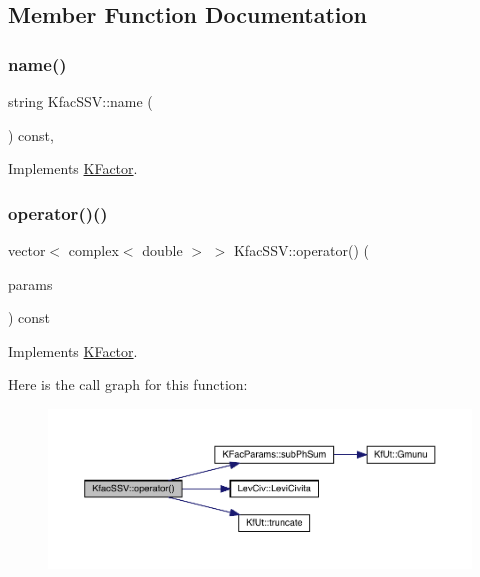 \subsection{Member Function Documentation}
\mbox{\label{classKfacSSV_a72d5e577525fa97365dbcfd4c5bea88d}} 
\subsubsection{\texorpdfstring{name()}{name()}}
{\footnotesize\ttfamily string Kfac\+S\+S\+V\+::name (\begin{DoxyParamCaption}{ }\end{DoxyParamCaption}) const\hspace{0.3cm}{\ttfamily [inline]}, {\ttfamily [virtual]}}



Implements \mbox{\hyperlink{classKFactor_ae578f8d6e4b525895427717da99cab6c}{K\+Factor}}.

\mbox{\label{classKfacSSV_aeea4f3f068452d233d4111d72c05cd4f}} 
\subsubsection{\texorpdfstring{operator()()}{operator()()}}
{\footnotesize\ttfamily vector$<$ complex$<$ double $>$ $>$ Kfac\+S\+S\+V\+::operator() (\begin{DoxyParamCaption}\item[{const \mbox{\hyperlink{classKFacParams}{K\+Fac\+Params}} \&}]{params }\end{DoxyParamCaption}) const\hspace{0.3cm}{\ttfamily [virtual]}}



Implements \mbox{\hyperlink{classKFactor_a012aae9ff4a07eab86d5d50b7f774285}{K\+Factor}}.

Here is the call graph for this function\+:
\nopagebreak
\begin{figure}[H]
\begin{center}
\leavevmode
\includegraphics[width=350pt]{d8/d76/classKfacSSV_aeea4f3f068452d233d4111d72c05cd4f_cgraph}
\end{center}
\end{figure}


